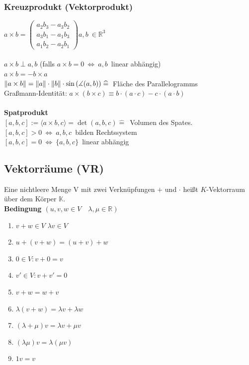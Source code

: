 \documentclass[6pt,a4paper]{scrartcl}
\newcommand{\norm}[2][\relax]{\ifx#1\relax \ensuremath{\left\Vert#2\right\Vert}\else \ensuremath{\left\Vert#2\right\Vert_{#1}}\fi}
\begin{document}
\begin{multicols*}{4}
\subsubsection{Kreuzprodukt (Vektorprodukt)}
$a\times b=\left( \begin{matrix} a_2b_3-a_3b_2\\a_3b_1-a_1b_3\\a_1b_2-a_2b_1\end{matrix}\right)$\qquad $a,b\ \in \mathbb R^3$\\
\\
$a\times b \perp a,b$ \qquad (falls $a\times b=0\ \Leftrightarrow\ a,b$\ linear abhängig)\\
$a \times b = -b \times a$\\
$\norm{a\times b}=\norm{a}\cdot\norm{b}\cdot \sin\left(\measuredangle (a,b)\right)\mathrel{\widehat{=}}$\ Fläche des Parallelogramms\\
Graßmann-Identität: $a\times(b \times c)\equiv b\cdot(a \cdot c)-c\cdot(a \cdot b)$\\
\\
\textbf{Spatprodukt}\\
$[a,b,c]:=\langle  a\times b, c\rangle=\det (a,b,c)\mathrel{\widehat{=}}$\ Volumen des Spates.\\
$[a,b,c]>0\ \Leftrightarrow\ a,b,c$\ bilden Rechtssystem \\ $[a,b,c]=0\ \Leftrightarrow\ \{a,b,c\}$\ linear abhängig

\subsection{Vektorräume (VR)}
Eine nichtleere Menge V mit zwei Verknüpfungen $+$ und $\cdot$ heißt $K$-Vektorraum über dem Körper $\mathbb K$. \\
\textbf{Bedingung $(u,v,w\in V \quad \lambda,\mu \in \mathbb{R})$}
\begin{enumerate}\itemsep0pt
\item $v+w\in V$ \qquad $\lambda v \in V$
\item $u+(v+w)=(u+v)+w$
\item $0\in V: v+0=v$
\item $v'\in V: v+v'=0$
\item $v+w=w+v$
\item $\lambda(v+w)=\lambda v + \lambda w$
\item $(\lambda + \mu)v=\lambda v +\mu v $
\item $(\lambda \mu)v = \lambda(\mu v)$
\item $1v=v$
\end{enumerate}\itemsep0pt

\end{multicols*}
\end{document}
